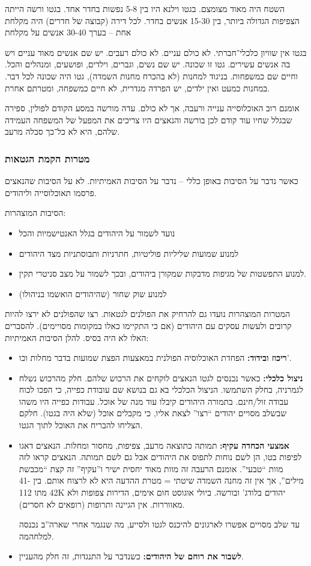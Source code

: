 \documentclass[a4paper]{book}
\begin{document}
	השטח היה מאוד מצומצם. בגטו וילנא היו בין 5-8 נפשות בחדר אחד. בגטו ורשה הייתה הצפיפות הגדולה ביותר, בין 15-30 אנשים בחדר. לכל דירה (קבוצה של חדרים) היה מקלחת אחת – בערך 30-40 אנשים על מקלחת
	
	בגטו אין שוויון כלכלי־חברתי. לא כולם עניים. לא כולם רעבים. יש שם אנשים מאוד עניים ויש בה אנשים עשירים. גטו זו שכונה. יש שם נשים, וגברים, וילדים, ופושעים, ומנהלים והכל. וחיים שם כמשפחות. בניגוד למחנות (לא בהכרח מחנות השמדה), גטו היה שכונה לכל דבר. במחנות כמעט ואין ילדים, יש הפרדה מגדרית, לא חיים כמשפחה, ומטרתם אחרת. 
	
	אומנם רוב האוכלוסייה ענייה ורעבה, אך לא כולם. עדה מורשה במסע הקודם לפולין, ספירה שבגלל שחיו עוד קודם לכן בורשה והנאצים היו צריכים את המפעל של המשפחה העמידה שלהם, היא לא כל־כך סבלה מרעב. 
	
	\subsubsection{מטרות הקמת הגטאות}
	כאשר נדבר על הסיבות באופן כללי – נדבר על הסיבות האמיתיות. לא על הסיבות שהנאצים פרסמו תאוכלוסייה וליהודים. 
	
	הסיבות המוצהרות: 
	\begin{itemize}
		\item נועד לשמור על היהודים בגלל האנטישמיות והכל
		\item למנוע שמועות שליליות פוליטיות, חתרניות ותבוסתניות מצד היהודים
		\item למנוע התפשטות של מגיפות מדבקות שמקורן ביהודים, ובכך לשמור על מצב סניטרי תקין. 
		\item למנוע שוק שחור (שהיהודים הואשמו בניהולו)
	\end{itemize}
	
	המטרות המוצהרות נועדו גם להרחיק את הפולנים לגטאות. רצו שהפולנים לא ירצו להיות קרובים ולעשות עסקים עם היהודים (אם כי התקיימו כאלו במקומות מסויימים). להסברים האלו לא היה בסיס. להלן הסיבות האמיתיות: 
	\begin{itemize}
		\item \textbf{ריכוז ובידוד: }הפחדת האוכלוסיה הפולנית במאצעות הפצת שמועות בדבר מחלות וכו'. 
		\item \textbf{ניצול כלכלי:} כאשר נכנסים לגטו הנאצים לוקחים את הרכוש שלהם. חלק מהרכוש נשלח לגמרניה, בחלק השתמשו. הניצול הכלכלי בא גם בנושא שם עובודת כפייה, כי הפכו לכוח עבודה זול/חינם. בתמורה היהודים קיבלו עוד מנה של אוכל. עבודות כפייה היו משהו שבשלב מסויים יהודים ``רצו'' לצאת אליו, כי מקבלים אוכל (שלא היה בגטו). חלקם הצליחו להבריח את האוכל לתוך הגטו. 
		\item \textbf{אמצעי הכחדה עקיף: }תמותה כתוצאה מרעב, צפיפות, מחסור ומחלות. הנאצים דאגו לפיפות בטו, הן לשם נוחות לתפוס את היהודים אבל גם לשם תמותה. הנאצים קראו לזה מוות ``טבעי''. אומנם הרעבה זה מוות מאוד יחסית ישיר ו''עקיף'' זה קצת ``מכבשת מילים'', אך אין זה מחנה השמדה שיטתי = מטרת ההדעה היא לא לרצוח אותם. בין 41-42 מתו 112K יהודים בלודג' ובורשה. ביולי אוגוסט חום אימים, הדירות צפופות ולא מאווררות. אין הגיינה ותרופות (רופאים לא חסרים). 
		
		עד שלב מסויים אפשרו לארגונים להיכנס לגטו ולסייע, מה שנגמר אחרי שארה''ב נכנסה למלחהמה. 
		\item \textbf{לשבור את רוחם של היהודים: }כשנדבר על התנגדות, זה חלק מהעניין. 
	\end{itemize}
	
\end{document}
